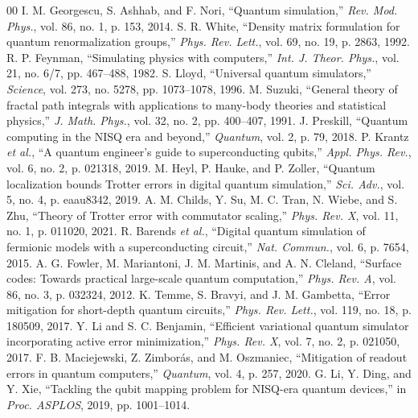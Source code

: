 \documentclass[conference]{IEEEtran}
\begin{document}
\begin{thebibliography}{00}
 I. M. Georgescu, S. Ashhab, and F. Nori, ``Quantum simulation,'' \textit{Rev. Mod. Phys.}, vol. 86, no. 1, p. 153, 2014.
 S. R. White, ``Density matrix formulation for quantum renormalization groups,'' \textit{Phys. Rev. Lett.}, vol. 69, no. 19, p. 2863, 1992.
 R. P. Feynman, ``Simulating physics with computers,'' \textit{Int. J. Theor. Phys.}, vol. 21, no. 6/7, pp. 467--488, 1982.
 S. Lloyd, ``Universal quantum simulators,'' \textit{Science}, vol. 273, no. 5278, pp. 1073--1078, 1996.
 M. Suzuki, ``General theory of fractal path integrals with applications to many-body theories and statistical physics,'' \textit{J. Math. Phys.}, vol. 32, no. 2, pp. 400--407, 1991.
 J. Preskill, ``Quantum computing in the NISQ era and beyond,'' \textit{Quantum}, vol. 2, p. 79, 2018.
 P. Krantz \textit{et al.}, ``A quantum engineer's guide to superconducting qubits,'' \textit{Appl. Phys. Rev.}, vol. 6, no. 2, p. 021318, 2019.
 M. Heyl, P. Hauke, and P. Zoller, ``Quantum localization bounds Trotter errors in digital quantum simulation,'' \textit{Sci. Adv.}, vol. 5, no. 4, p. eaau8342, 2019.
 A. M. Childs, Y. Su, M. C. Tran, N. Wiebe, and S. Zhu, ``Theory of Trotter error with commutator scaling,'' \textit{Phys. Rev. X}, vol. 11, no. 1, p. 011020, 2021.
 R. Barends \textit{et al.}, ``Digital quantum simulation of fermionic models with a superconducting circuit,'' \textit{Nat. Commun.}, vol. 6, p. 7654, 2015.
 A. G. Fowler, M. Mariantoni, J. M. Martinis, and A. N. Cleland, ``Surface codes: Towards practical large-scale quantum computation,'' \textit{Phys. Rev. A}, vol. 86, no. 3, p. 032324, 2012.
 K. Temme, S. Bravyi, and J. M. Gambetta, ``Error mitigation for short-depth quantum circuits,'' \textit{Phys. Rev. Lett.}, vol. 119, no. 18, p. 180509, 2017.
 Y. Li and S. C. Benjamin, ``Efficient variational quantum simulator incorporating active error minimization,'' \textit{Phys. Rev. X}, vol. 7, no. 2, p. 021050, 2017.
 F. B. Maciejewski, Z. Zimbor\'as, and M. Oszmaniec, ``Mitigation of readout errors in quantum computers,'' \textit{Quantum}, vol. 4, p. 257, 2020.
 G. Li, Y. Ding, and Y. Xie, ``Tackling the qubit mapping problem for NISQ-era quantum devices,'' in \textit{Proc. ASPLOS}, 2019, pp. 1001--1014.
\end{thebibliography}
\end{document}
